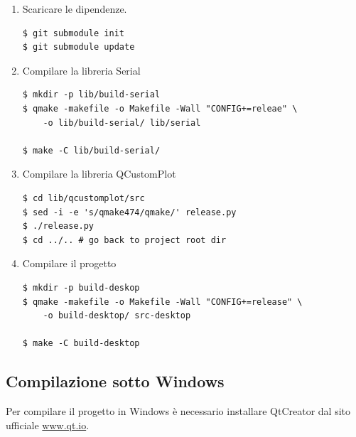 \begin{enumerate}
\item Scaricare le dipendenze.
\begin{Verbatim}[frame=single]
$ git submodule init
$ git submodule update
\end{Verbatim}

\item Compilare la libreria Serial
\begin{Verbatim}[frame=single]
$ mkdir -p lib/build-serial
$ qmake -makefile -o Makefile -Wall "CONFIG+=releae" \
    -o lib/build-serial/ lib/serial

$ make -C lib/build-serial/
\end{Verbatim}

\item Compilare la libreria QCustomPlot
\begin{Verbatim}[frame=single]
$ cd lib/qcustomplot/src
$ sed -i -e 's/qmake474/qmake/' release.py
$ ./release.py
$ cd ../.. # go back to project root dir
\end{Verbatim}

\item Compilare il progetto
\begin{Verbatim}[frame=single]
$ mkdir -p build-deskop
$ qmake -makefile -o Makefile -Wall "CONFIG+=release" \
    -o build-desktop/ src-desktop

$ make -C build-desktop
\end{Verbatim}
\end{enumerate}

\subsection{Compilazione sotto Windows}
Per compilare il progetto in Windows \`e necessario installare QtCreator dal
sito ufficiale \url{www.qt.io}.

